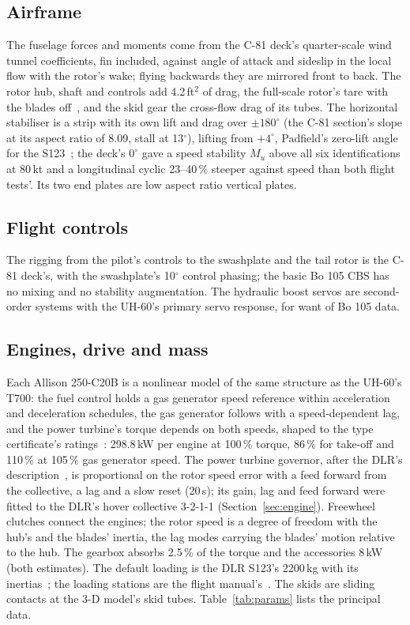 \documentclass[10pt,a4paper,twocolumn]{article}
\begin{document}
\subsection{Airframe}
The fuselage forces and moments come from the C-81 deck's quarter-scale wind tunnel coefficients, fin included, against angle of
attack and sideslip in the local flow with the rotor's wake; flying backwards they are mirrored front to back. The rotor hub, shaft and
controls add 4.2\,ft$^2$ of drag, the full-scale rotor's tare with the blades off~\cite{pm}, and the skid gear the cross-flow drag of its tubes. The
horizontal stabiliser is a strip with its own lift and drag over $\pm180^\circ$ (the C-81 section's slope at its aspect ratio of 8.09, stall at
13$^\circ$), lifting from $+4^\circ$, Padfield's zero-lift angle for the S123~\cite{pad}; the deck's $0^\circ$ gave a speed stability $M_u$ above
all six identifications at 80\,kt and a longitudinal cyclic 23--40\,\% steeper against speed than both flight tests'. Its two end plates are low
aspect ratio vertical plates.

\subsection{Flight controls}
The rigging from the pilot's controls to the swashplate and the tail rotor is the C-81 deck's, with the swashplate's 10$^\circ$ control phasing; the
basic Bo 105 CBS has no mixing and no stability augmentation. The hydraulic boost servos are second-order systems with the UH-60's primary servo
response, for want of Bo 105 data.

\subsection{Engines, drive and mass}
Each Allison 250-C20B is a nonlinear model of the same structure as the UH-60's T700: the fuel control holds a gas generator speed reference within
acceleration and deceleration schedules, the gas generator follows with a speed-dependent lag, and the power turbine's torque depends on both speeds,
shaped to the type certificate's ratings~\cite{ea}: 298.8\,kW per engine at 100\,\% torque, 86\,\% for take-off and 110\,\% at 105\,\% gas generator speed.
The power turbine governor, after the DLR's description~\cite{hg}, is proportional on the rotor speed error with a feed forward from the collective, a lag
and a slow reset (20\,s); its gain, lag and feed forward were fitted to the DLR's hover collective 3-2-1-1 (Section~\ref{sec:engine}). Freewheel clutches
connect the engines; the rotor speed is a degree of freedom with the hub's and the blades' inertia, the lag modes carrying the blades' motion
relative to the hub. The gearbox absorbs 2.5\,\% of the torque and the accessories 8\,kW (both estimates). The default loading is the DLR S123's
2200\,kg with its inertias~\cite{ar}; the loading stations are the flight manual's~\cite{fm}. The skids are sliding contacts at the 3-D model's skid tubes.
Table~\ref{tab:params} lists the principal data.
\end{document}
